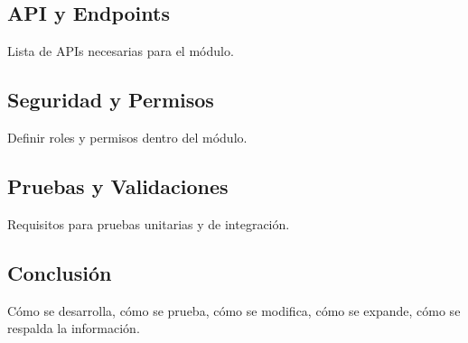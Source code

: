 \subsection{API y Endpoints}
Lista de APIs necesarias para el módulo.

\subsection{Seguridad y Permisos}
Definir roles y permisos dentro del módulo.

\subsection{Pruebas y Validaciones}
Requisitos para pruebas unitarias y de integración.

\subsection{Conclusión}
Cómo se desarrolla, cómo se prueba, cómo se modifica, cómo se expande, cómo se respalda la información.
